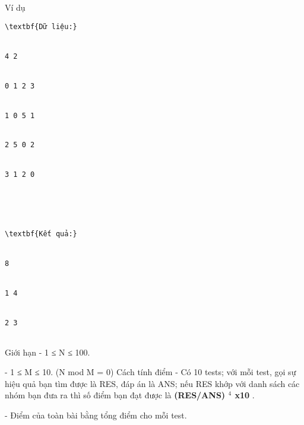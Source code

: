 Ví dụ
\begin{verbatim}
\textbf{Dữ liệu:}


4 2


0 1 2 3


1 0 5 1


2 5 0 2


3 1 2 0





\textbf{Kết quả:}


8


1 4


2 3


\end{verbatim}
Giới hạn
- 1 ≤ N ≤ 100.   


   - 1 ≤ M ≤ 10. (N mod M = 0)
Cách tính điểm
- Có 10 tests; với mỗi test, gọi sự hiệu quả bạn tìm được là RES, đáp án là ANS; nếu RES khớp với danh sách các nhóm bạn đưa ra thì số điểm bạn đạt được là   \textbf{    (RES/ANS)    $^     4    $    x10   }   .   


   - Điểm của toàn bài bằng tổng điểm cho mỗi test.